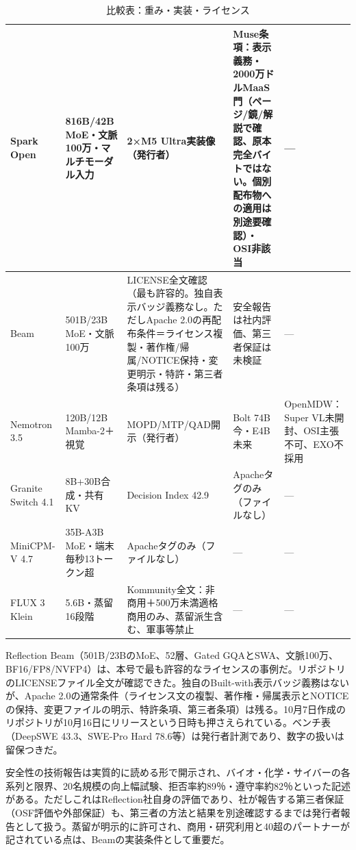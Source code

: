 \documentclass[lualatex,a4paper,10pt]{jlreq}
\begin{document}
\begin{table}[htbp]\centering\footnotesize
\caption{比較表：重み・実装・ライセンス}
\begin{tabularx}{0.96\linewidth}{@{}lXXXX@{}}
\toprule
Spark Open & 816B/42B MoE・文脈100万・マルチモーダル入力 & 2×M5 Ultra実装像（発行者） & Muse条項：表示義務・2000万ドルMaaS門（ページ/鏡/解説で確認、原本完全バイトではない。個別配布物への適用は別途要確認）・OSI非該当 & --- \cite{B14,B13,B15} \\
\midrule
Beam & 501B/23B MoE・文脈100万 & LICENSE全文確認（最も許容的。独自表示バッジ義務なし。ただしApache 2.0の再配布条件＝ライセンス複製・著作権/帰属/NOTICE保持・変更明示・特許・第三者条項は残る） & 安全報告は社内評価、第三者保証は未検証 & --- \cite{B17,B18,B16,B19} \\
\midrule
Nemotron 3.5 & 120B/12B Mamba-2＋視覚 & MOPD/MTP/QAD開示（発行者） & Bolt 74B今・E4B未来 & OpenMDW：Super VL未開封、OSI主張不可、EXO不採用 \cite{B21,B22,B20} \\
\midrule
Granite Switch 4.1 & 8B+30B合成・共有KV & Decision Index 42.9 & Apacheタグのみ（ファイルなし） & --- \cite{B24,B25,B23} \\
\midrule
MiniCPM-V 4.7 & 35B-A3B MoE・端末毎秒13トークン超 & Apacheタグのみ（ファイルなし） & --- & --- \cite{B27,B26} \\
\midrule
FLUX 3 Klein & 5.6B・蒸留16段階 & Kommunity全文：非商用＋500万未満適格商用のみ、蒸留派生含む、軍事等禁止 & --- & --- \cite{B29,B30,B28} \\
\bottomrule
\end{tabularx}
\end{table}

Reflection Beam（501B/23BのMoE、52層、Gated GQAとSWA、文脈100万、BF16/FP8/NVFP4）は、本号で最も許容的なライセンスの事例だ。リポジトリのLICENSEファイル全文が確認できた。独自のBuilt-with表示バッジ義務はないが、Apache 2.0の通常条件（ライセンス文の複製、著作権・帰属表示とNOTICEの保持、変更ファイルの明示、特許条項、第三者条項）は残る。10月7日作成のリポジトリが10月16日にリリースという日時も押さえられている。ベンチ表（DeepSWE 43.3、SWE-Pro Hard 78.6等）は発行者計測であり、数字の扱いは留保つきだ。
\cite{B16,B17,B18,B19}


安全性の技術報告は実質的に読める形で開示され、バイオ・化学・サイバーの各系列と限界、20名規模の向上幅試験、拒否率約89％・遵守率約82％といった記述がある。ただしこれはReflection社自身の評価であり、社が報告する第三者保証（OSF評価や外部保証）も、第三者の方法と結果を別途確認するまでは発行者報告として扱う。蒸留が明示的に許可され、商用・研究利用と40超のパートナーが記されている点は、Beamの実装条件として重要だ。
\cite{B16,B17,B18,B19}
\end{document}
